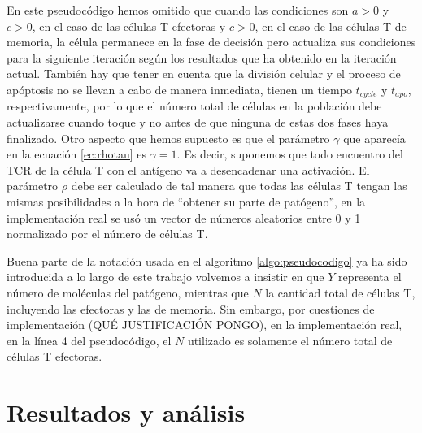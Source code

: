 En este pseudocódigo hemos omitido que cuando las condiciones son $a > 0$ y $c > 0$, en el caso de las células T efectoras y $c > 0$, en el caso de las células T de memoria, la célula permanece en la fase de decisión pero actualiza sus condiciones para la siguiente iteración según los resultados que ha obtenido en la iteración actual. También hay que tener en cuenta que la división celular y el proceso de apóptosis no se llevan a cabo de manera inmediata, tienen un tiempo $t_{cycle}$ y $t_{apo}$, respectivamente, por lo que el número total de células en la población debe actualizarse cuando toque y no antes de que ninguna de estas dos fases haya finalizado. Otro aspecto que hemos supuesto es que el parámetro $\gamma$ que aparecía en la ecuación \ref{ec:rhotau} es $\gamma = 1$. Es decir, suponemos que todo encuentro del TCR de la célula T con el antígeno va a desencadenar una activación. El parámetro $\rho$ debe ser calculado de tal manera que todas las células T tengan las mismas posibilidades a la hora de ``obtener su parte de patógeno'', en la implementación real se usó un vector de números aleatorios entre 0 y 1 normalizado por el número de células T.

Buena parte de la notación usada en el algoritmo \ref{algo:pseudocodigo} ya ha sido introducida a lo largo de este trabajo volvemos a insistir en que $Y$ representa el número de moléculas del patógeno, mientras que $N$ la cantidad total de células T, incluyendo las efectoras y las de memoria. Sin embargo, por cuestiones de implementación (QUÉ JUSTIFICACIÓN PONGO), en la implementación real, en la línea 4 del pseudocódigo, el $N$ utilizado es solamente el número total de células T efectoras.

\section{Resultados y análisis}
